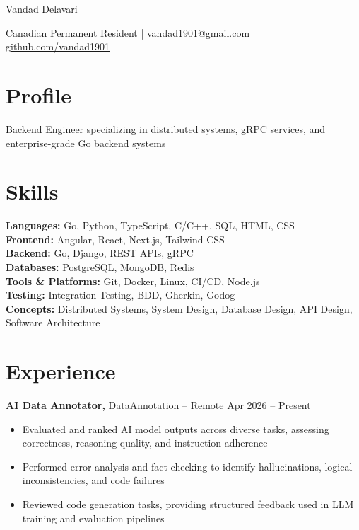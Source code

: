 \documentclass[11pt]{article}       %
\begin{document}
\centerline{\Huge Vandad Delavari}

\vspace{5pt}

\centerline{Canadian Permanent Resident | \href{mailto:vandad1901@gmail.com}{vandad1901@gmail.com} | \href{https://github.com/vandad1901}{github.com/vandad1901}}

\vspace{-10pt}

\section*{Profile}
Backend Engineer specializing in distributed systems, gRPC services, and enterprise-grade Go backend systems

\section*{Skills}
\textbf{Languages:} Go, Python, TypeScript, C/C++, SQL, HTML, CSS \\
\textbf{Frontend:} Angular, React, Next.js, Tailwind CSS \\
\textbf{Backend:} Go, Django, REST APIs, gRPC \\
\textbf{Databases:} PostgreSQL, MongoDB, Redis \\
\textbf{Tools \& Platforms:} Git, Docker, Linux, CI/CD, Node.js \\
\textbf{Testing:} Integration Testing, BDD, Gherkin, Godog \\
\textbf{Concepts:} Distributed Systems, System Design, Database Design, API Design, Software Architecture
\vspace{-6.5pt}

\section*{Experience}
\textbf{AI Data Annotator,} {DataAnnotation} -- Remote \hfill Apr 2026 -- Present \\
\vspace{-9pt}
\begin{itemize}
\item Evaluated and ranked AI model outputs across diverse tasks, assessing correctness, reasoning quality, and instruction adherence
\item Performed error analysis and fact-checking to identify hallucinations, logical inconsistencies, and code failures
\item Reviewed code generation tasks, providing structured feedback used in LLM training and evaluation pipelines
\end{itemize}
\end{document}
